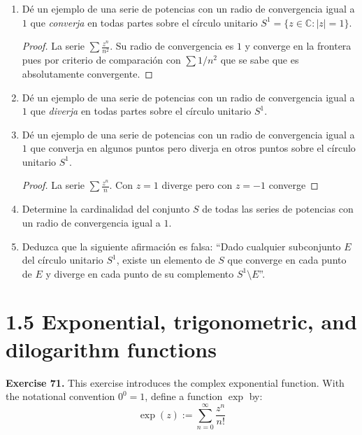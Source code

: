 \documentclass[11pt,a4paper]{article}
\theoremstyle{definition}
\theoremstyle{plain}
\theoremstyle{remark}
\begin{document}
	\begin{enumerate}[label=\textbf{(70.\arabic*)}, leftmargin=*]
		\item Dé un ejemplo de una serie de potencias con un radio de convergencia igual a $1$ que \textit{converja} en todas partes sobre el círculo unitario $S^1 = \{z \in \mathbb{C} : |z| = 1\}$.
		
		\begin{proof}
			La serie $\sum \frac{z^n}{n^2}$. Su radio de convergencia es $1$ y converge en la frontera pues por criterio de comparación con $\sum 1/n^2$ que se sabe que es absolutamente convergente.
		\end{proof}
		
		\item Dé un ejemplo de una serie de potencias con un radio de convergencia igual a $1$ que \textit{diverja} en todas partes sobre el círculo unitario $S^1$.
		
		\item Dé un ejemplo de una serie de potencias con un radio de convergencia igual a $1$ que converja en algunos puntos pero diverja en otros puntos sobre el círculo unitario $S^1$.
		
		\begin{proof}
			La serie $\sum \frac{z^n}{n}$. Con $z=1$ diverge pero con $z=-1$ converge
		\end{proof}
		
		\item Determine la cardinalidad del conjunto $S$ de todas las series de potencias con un radio de convergencia igual a $1$.
		
		\item Deduzca que la siguiente afirmación es falsa: ``Dado cualquier subconjunto $E$ del círculo unitario $S^1$, existe un elemento de $S$ que converge en cada punto de $E$ y diverge en cada punto de su complemento $S^1 \setminus E$''.
	\end{enumerate}
	
	\section*{1.5 Exponential, trigonometric, and dilogarithm functions}
	
	\noindent \textbf{Exercise 71.} This exercise introduces the complex exponential function. With the notational convention $0^0 = 1$, define a function $\exp$ by:
	\begin{equation}\tag{9}
		\exp(z) := \sum_{n=0}^\infty \frac{z^n}{n!}
	\end{equation}
	
\end{document}
